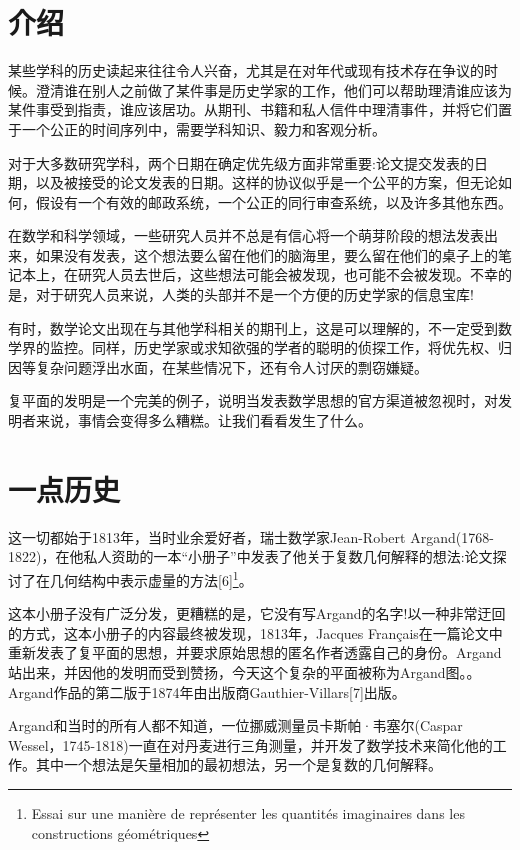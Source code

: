 \section{介绍}
某些学科的历史读起来往往令人兴奋，尤其是在对年代或现有技术存在争议的时候。澄清谁在别人之前做了某件事是历史学家的工作，他们可以帮助理清谁应该为某件事受到指责，谁应该居功。从期刊、书籍和私人信件中理清事件，并将它们置于一个公正的时间序列中，需要学科知识、毅力和客观分析。

对于大多数研究学科，两个日期在确定优先级方面非常重要:论文提交发表的日期，以及被接受的论文发表的日期。这样的协议似乎是一个公平的方案，但无论如何，假设有一个有效的邮政系统，一个公正的同行审查系统，以及许多其他东西。

在数学和科学领域，一些研究人员并不总是有信心将一个萌芽阶段的想法发表出来，如果没有发表，这个想法要么留在他们的脑海里，要么留在他们的桌子上的笔记本上，在研究人员去世后，这些想法可能会被发现，也可能不会被发现。不幸的是，对于研究人员来说，人类的头部并不是一个方便的历史学家的信息宝库!

有时，数学论文出现在与其他学科相关的期刊上，这是可以理解的，不一定受到数学界的监控。同样，历史学家或求知欲强的学者的聪明的侦探工作，将优先权、归因等复杂问题浮出水面，在某些情况下，还有令人讨厌的剽窃嫌疑。

复平面的发明是一个完美的例子，说明当发表数学思想的官方渠道被忽视时，对发明者来说，事情会变得多么糟糕。让我们看看发生了什么。

\section{一点历史}
这一切都始于1813年，当时业余爱好者，瑞士数学家Jean-Robert Argand(1768-1822)，在他私人资助的一本“小册子”中发表了他关于复数几何解释的想法:论文探讨了在几何结构中表示虚量的方法[6]\footnote{Essai sur une manière de représenter les quantités imaginaires dans les constructions géométriques}。

这本小册子没有广泛分发，更糟糕的是，它没有写Argand的名字!以一种非常迂回的方式，这本小册子的内容最终被发现，1813年，Jacques Français在一篇论文中重新发表了复平面的思想，并要求原始思想的匿名作者透露自己的身份。Argand站出来，并因他的发明而受到赞扬，今天这个复杂的平面被称为Argand图。。Argand作品的第二版于1874年由出版商Gauthier-Villars[7]出版。

Argand和当时的所有人都不知道，一位挪威测量员卡斯帕·韦塞尔(Caspar Wessel，1745-1818)一直在对丹麦进行三角测量，并开发了数学技术来简化他的工作。其中一个想法是矢量相加的最初想法，另一个是复数的几何解释。


